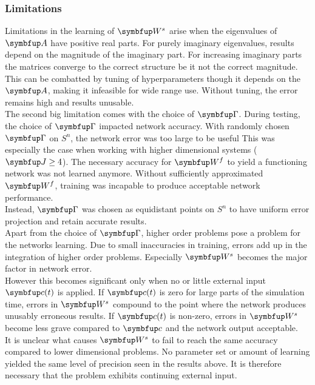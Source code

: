 \subsubsection{Limitations}
Limitations in the learning of $\bmu{W}^s$ arise when the eigenvalues of $\bmu{A}$ have positive real parts. For purely imaginary eigenvalues, results depend on the magnitude of the imaginary part. For increasing imaginary parts the matrices converge to the correct structure be it not the correct magnitude. This can be combatted by tuning of hyperparameters though it depends on the $\bmu{A}$, making it infeasible for wide range use. Without tuning, the error remains high and results unusable.\\
The second big limitation comes with the choice of $\bmu{\Gamma}$. During testing, the choice of $\bmu{\Gamma}$ impacted network accuracy. With randomly chosen $\bmu{\Gamma}$ on $\mathit{S}^n$, the network error was too large to be useful This was especially the case when working with higher dimensional systems ($\bmu{J}\geq4$). The necessary accuracy for $\bmu{W}^f$ to yield a functioning network was not learned anymore. Without sufficiently approximated $\bmu{W}^f$, training was incapable to produce acceptable network performance.\\
Instead, $\bmu{\Gamma}$ was chosen as equidistant points on $\mathit{S}^n$ to have uniform error projection and retain accurate results.\\
Apart from the choice of $\bmu{\Gamma}$, higher order problems pose a problem for the networks learning. Due to small inaccuracies in training, errors add up in the integration of higher order problems. Especially $\bmu{W}^s$ becomes the major factor in network error.\\
However this becomes significant only when no or little external input $\bmu{c}(t)$ is applied. If $\bmu{c}(t)$ is zero for large parts of the simulation time, errors in $\bmu{W}^s$ compound to the point where the network produces unusably erroneous results. If $\bmu{c}(t)$ is non-zero, errors in $\bmu{W}^s$ become less grave compared to $\bmu{c}$ and the network output acceptable.\\
It is unclear what causes $\bmu{W}^s$ to fail to reach the same accuracy compared to lower dimensional problems. No parameter set or amount of learning yielded the same level of precision seen in the results above. It is therefore necessary that the problem exhibits continuing external input.\\

